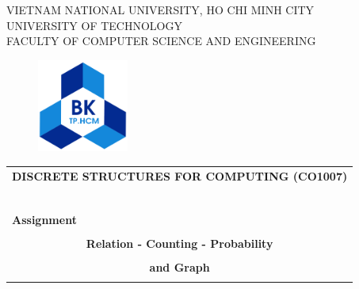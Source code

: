 \documentclass[a4paper]{article}
\begin{document}
    \begin{titlepage}
        \begin{center}
            VIETNAM NATIONAL UNIVERSITY, HO CHI MINH CITY \\
            UNIVERSITY OF TECHNOLOGY \\
            FACULTY OF COMPUTER SCIENCE AND ENGINEERING
        \end{center}

        \vspace{1cm}

        \begin{figure}[h!]
            \begin{center}
                \includegraphics[width=3cm]{hcmut.png}
            \end{center}
        \end{figure}

        \vspace{1cm}


        \begin{center}
            \begin{tabular}{c}
                \multicolumn{1}{l}{\textbf{{\Large DISCRETE STRUCTURES FOR COMPUTING (CO1007)}}}\\
                ~~                                                                               \\
                \hline
                \\
                \multicolumn{1}{l}{\textbf{{\Large Assignment}}}                               \\
                \\
                \textbf{{\Huge Relation - Counting - Probability}}\\
                \\
                \textbf{{\Huge and Graph}}\\
                \\
                \hline
            \end{tabular}
        \end{center}

        \vspace{3cm}


\end{titlepage}
\end{document}

